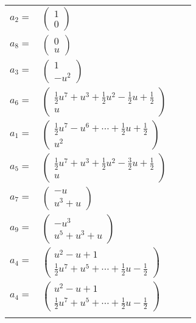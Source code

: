 \documentclass[1p]{elsarticle_modified}
\theoremstyle{definition}
\begin{document}
\begin{tabular}{m{7pt} m{180pt} m{7pt} m{180pt} }
\flushright $a_{2}=$&$\begin{pmatrix}1\\0\end{pmatrix}$ \\
\flushright $a_{8}=$&$\begin{pmatrix}0\\u\end{pmatrix}$ \\
\flushright $a_{3}=$&$\begin{pmatrix}1\\- u^2\end{pmatrix}$ \\
\flushright $a_{6}=$&$\begin{pmatrix}\frac{1}{2} u^7+u^3+\frac{1}{2} u^2-\frac{1}{2} u+\frac{1}{2}\\u\end{pmatrix}$ \\
\flushright $a_{1}=$&$\begin{pmatrix}\frac{1}{2} u^7- u^6+\cdots+\frac{1}{2} u+\frac{1}{2}\\u^2\end{pmatrix}$ \\
\flushright $a_{5}=$&$\begin{pmatrix}\frac{1}{2} u^7+u^3+\frac{1}{2} u^2-\frac{3}{2} u+\frac{1}{2}\\u\end{pmatrix}$ \\
\flushright $a_{7}=$&$\begin{pmatrix}- u\\u^3+u\end{pmatrix}$ \\
\flushright $a_{9}=$&$\begin{pmatrix}- u^3\\u^5+u^3+u\end{pmatrix}$ \\
\flushright $a_{4}=$&$\begin{pmatrix}u^2- u+1\\\frac{1}{2} u^7+u^5+\cdots+\frac{1}{2} u-\frac{1}{2}\end{pmatrix}$\\ \flushright $a_{4}=$&$\begin{pmatrix}u^2- u+1\\\frac{1}{2} u^7+u^5+\cdots+\frac{1}{2} u-\frac{1}{2}\end{pmatrix}$\\&\end{tabular}
\end{document}
